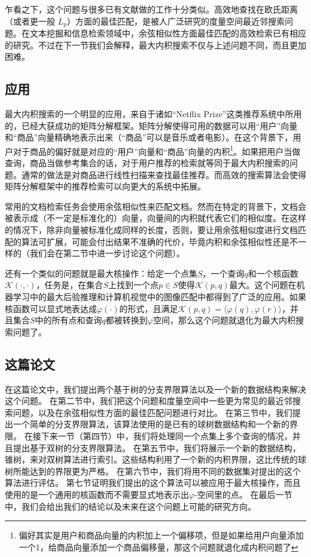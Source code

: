 \documentclass[twocolumn,a4paper]{article}
\begin{document}
乍看之下，这个问题与很多已有文献做的工作十分类似。高效地查找在欧氏距离（或者更一般 $L_p$）方面的最佳匹配，是被人广泛研究的度量空间最近邻搜索问题\cite{9}。在文本挖掘和信息检索领域中，余弦相似性方面最佳匹配的高效检索已有相应的研究\cite{1}。不过在下一节我们会解释，最大内积搜索不仅与上述问题不同，而且更加困难。

\subsection{应用}
最大内积搜索的一个明显的应用，来自于诸如“Netflix Prize”\cite{22, 21, 2}这类推荐系统中所用的，已经大获成功的矩阵分解框架。矩阵分解使得可用的数据可以用“用户”向量和“商品”向量精确地表示出来（“商品”可以是音乐或者电影）。在这个背景下，用户对于商品的偏好就是对应的“用户”向量和“商品”向量的内积\footnote{偏好其实是用户和商品向量的内积加上一个偏移项，但是如果给用户向量添加一个1，给商品向量添加一个商品偏移量，那这个问题就退化成内积问题了}。如果把用户当做查询，商品当做参考集合的话，对于用户推荐的检索就等同于最大内积搜索的问题。通常的做法是对商品进行线性扫描来查找最佳推荐。而高效的搜索算法会使得矩阵分解框架中的推荐检索可以向更大的系统中拓展。

常用的文档检索任务会使用余弦相似性来匹配文档。然而在特定的背景下\cite{11}，文档会被表示成（不一定是标准化的）向量，向量间的内积就代表它们的相似度。在这样的情况下，除非向量被标准化成同样的长度，否则，要让用余弦相似度进行文档匹配的算法\cite{1}可扩展，可能会付出结果不准确的代价，毕竟内积和余弦相似性还是不一样的（我们会在第二节中进一步讨论这个问题）。

还有一个类似的问题就是最大核操作：给定一个点集$S$，一个查询$q$和一个核函数$\mathcal{K}(\cdot,\cdot)$，任务是，在集合$S$上找到一个点$p \in S$使得$\mathcal{K}(p,q)$最大。这个问题在机器学习中的最大后验推理\cite{20}和计算机视觉中的图像匹配\cite{23}中都得到了广泛的应用。如果核函数可以显式地表达成$\varphi(\cdot)$的形式，且满足$\mathcal{K}(p,q) = \langle \varphi(q), \varphi(r) \rangle$，并且集合$S$中的所有点和查询$q$都被转换到$\varphi$空间，那么这个问题就退化为最大内积搜索问题了。

\subsection{这篇论文}
在这篇论文中，我们提出两个基于树的分支界限算法以及一个新的数据结构来解决这个问题。
在第二节中，我们把这个问题和度量空间中一些更为常见的最近邻搜索问题，以及在余弦相似性方面的最佳匹配问题进行对比。
在第三节中，我们提出一个简单的分支界限算法，该算法使用的是已有的球树数据结构\cite{28}和一个新的界限。
在接下来一节（第四节）中，我们将处理同一个点集上多个查询的情况，并且提出基于双树的分支界限算法。
在第五节中，我们将展示一个新的数据结构，锥树，来对双树算法进行索引。这些结构利用了一个新的内积界限，这比传统的球树所能达到的界限更为严格。
在第六节中，我们将用不同的数据集对提出的这个算法进行评估。
第七节证明我们提出的这个算法可以被应用于最大核操作，而且使用的是一个通用的核函数而不需要显式地表示出$\varphi$-空间里的点。
在最后一节中，我们会给出我们的结论以及未来在这个问题上可能的研究方向。
\end{document}
